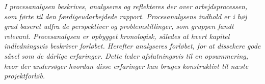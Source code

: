 \textit{I procesanalysen beskrives, analyseres og reflekteres der over arbejdsprocessen, som førte til den færdigeudarbejdede rapport. Procesanalysens indhold er i høj grad baseret udfra de perspektiver og problemstillinger, som gruppen fandt relevant. Procesanalysen er opbygget kronologisk, således at hvert kapitel indledningsvis beskriver forløbet. Herefter analyseres forløbet, for at dissekere gode såvel som de dårlige erfaringer. Dette leder afslutningsvis til en opsummering, hvor der undersøger hvordan disse erfaringer kan bruges konstruktivt til næste projektforløb.} 
